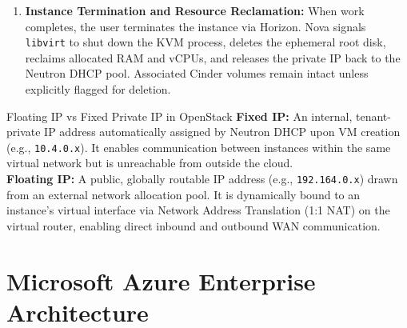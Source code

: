 \documentclass[11pt,a4paper,openany]{report}
\begin{document}
\begin{enumerate}[leftmargin=*]
    \begin{itemize}
      \item \emph{Command Line Access:} Direct terminal connection via secure shell:
      \begin{lstlisting}[language=bash]
ssh -i ~/.ssh/meghamala_key.pem ubuntu@192.164.0.8
      \end{lstlisting}
      \item \emph{Graphical Desktop Access via X2Go:} X2Go is an open-source remote desktop client based on NX technology, allowing high-performance graphical desktop access over low-bandwidth wide-area connections. The user configures an X2Go session targeting host \texttt{192.164.0.8}, specifying user \texttt{ubuntu}, RSA private key authentication, and session environment (e.g., XFCE or MATE).
    \end{itemize}
  \item \textbf{Instance Termination and Resource Reclamation:} When work completes, the user terminates the instance via Horizon. Nova signals \texttt{libvirt} to shut down the KVM process, deletes the ephemeral root disk, reclaims allocated RAM and vCPUs, and releases the private IP back to the Neutron DHCP pool. Associated Cinder volumes remain intact unless explicitly flagged for deletion.
\end{enumerate}

\begin{defbox}{Floating IP vs Fixed Private IP in OpenStack}
\textbf{Fixed IP:} An internal, tenant-private IP address automatically assigned by Neutron DHCP upon VM creation (e.g., \texttt{10.4.0.x}). It enables communication between instances within the same virtual network but is unreachable from outside the cloud.\\
\textbf{Floating IP:} A public, globally routable IP address (e.g., \texttt{192.164.0.x}) drawn from an external network allocation pool. It is dynamically bound to an instance's virtual interface via Network Address Translation (1:1 NAT) on the virtual router, enabling direct inbound and outbound WAN communication.
\end{defbox}

\section{Microsoft Azure Enterprise Architecture}
\end{document}
